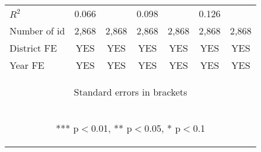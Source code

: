 \begin{center}
\begin{tabular}{lcccccc}
$R^2$ & 0.066 &  & 0.098 &  & 0.126 &  \\
Number of id & 2,868 & 2,868 & 2,868 & 2,868 & 2,868 & 2,868 \\
District FE & YES & YES & YES & YES & YES & YES \\
 Year FE & YES & YES & YES & YES & YES & YES \\ \hline
\multicolumn{7}{c}{\begin{footnotesize} Standard errors in brackets\end{footnotesize}} \\
\multicolumn{7}{c}{\begin{footnotesize} *** p$<$0.01, ** p$<$0.05, * p$<$0.1\end{footnotesize}} \\
\end{tabular}
\end{center}
